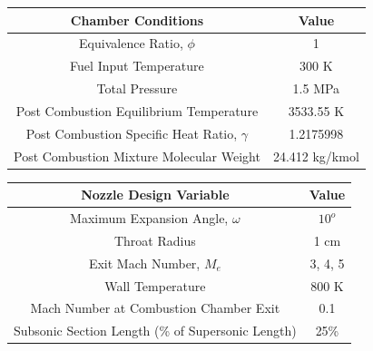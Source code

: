 \begin{table}[!h]
\begin{center}
\begin{threeparttable}


\begin{tabular}{cc}
\toprule
Chamber Conditions		&	Value \\
\midrule
Equivalence Ratio, $\phi$       &	1\\
Fuel Input Temperature		&	300 K\\
Total Pressure			&	1.5 MPa\\
Post Combustion Equilibrium Temperature		&	3533.55 K\\
Post Combustion Specific Heat Ratio, $\gamma$	&	1.2175998\\
Post Combustion Mixture Molecular Weight	&	24.412 kg/kmol\\

\bottomrule
\end{tabular}


\label{table:mixture}
\end{threeparttable}
\end{center}
\end{table}

\begin{table}[!h]
\begin{center}
\begin{threeparttable}


\begin{tabular}{cc}
\toprule
Nozzle Design Variable	&	Value \\
\midrule
Maximum Expansion Angle, $\omega$	&	$10^o$\\
Throat Radius				&	1 cm\\
Exit Mach Number, $M_e$			&	3, 4, 5\\
Wall Temperature			&	800 K\\
Mach Number at Combustion Chamber Exit 	&	0.1 \\
Subsonic Section Length (\% of Supersonic Length)&	25\% \\

\bottomrule
\end{tabular}


\label{table:nozcomp}
\end{threeparttable}
\end{center}
\end{table}

